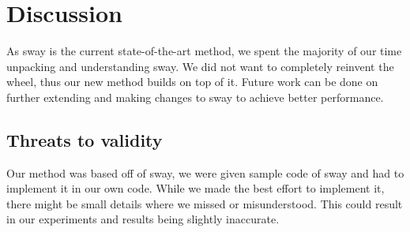 \section{Discussion}
\label{sec:discussion}

  As sway is the current state-of-the-art method, we spent the majority
  of our time unpacking and understanding sway. We did not want to
  completely reinvent the wheel, thus our new method builds on top of
  it. Future work can be done on further extending and making changes to
  sway to achieve better performance.

  \subsection{Threats to validity}
    Our method was based off of sway, we were given sample code of sway
    and had to implement it in our own code. While we made the best effort
    to implement it, there might be small details where we missed or
    misunderstood. This could result in our experiments and results being
    slightly inaccurate. 